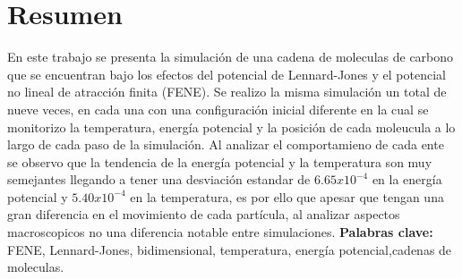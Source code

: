 \section{Resumen}
En este trabajo se presenta la simulación de una cadena de moleculas de carbono que se encuentran bajo los efectos del potencial
de Lennard-Jones y el potencial no lineal de atracción finita (FENE). Se realizo la misma simulación un total de nueve veces, en cada una
con una configuración inicial diferente en la cual se monitorizo la temperatura, energía potencial y la posición de cada moleucula a lo largo de 
cada paso de la simulación. Al analizar el comportamieno de cada ente se observo que la tendencia de la energía potencial y la temperatura son muy semejantes 
llegando a tener una desviación estandar de $6.65x10^{-4}$ en la energía potencial y $5.40x10^{-4}$ en la temperatura, es por ello que apesar que tengan
una gran diferencia en el movimiento de cada partícula, al analizar aspectos macroscopicos no una diferencia notable entre simulaciones.
\textbf{Palabras clave:} FENE, Lennard-Jones, bidimensional, temperatura, energía potencial,cadenas de moleculas.
